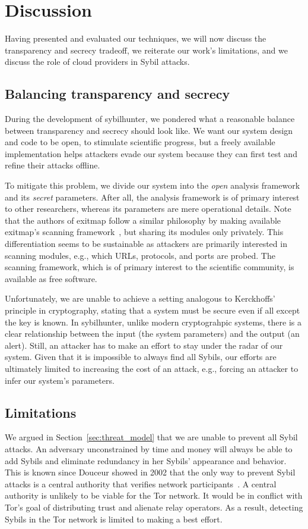 \section{Discussion}
\label{sec:discussion}
Having presented and evaluated our techniques, we will now discuss the
transparency and secrecy tradeoff, we reiterate our work's limitations, and we
discuss the role of cloud providers in Sybil attacks.

\subsection{Balancing transparency and secrecy}
\label{sec:secrecy}
During the development of sybilhunter, we pondered what a reasonable balance
between transparency and secrecy should look like.  We want our system design
and code to be open, to stimulate scientific progress, but a freely available
implementation helps attackers evade our system because they can first test and
refine their attacks offline.

To mitigate this problem, we divide our system into the \emph{open} analysis
framework and its \emph{secret} parameters.  After all, the analysis framework
is of primary interest to other researchers, whereas its parameters are mere
operational details.  Note that the authors of exitmap follow a similar
philosophy by making available exitmap's scanning framework~\cite{exitmap}, but
sharing its modules only privately.  This differentiation seems to be
sustainable as attackers are primarily interested in scanning modules, e.g.,
which URLs, protocols, and ports are probed.  The scanning framework, which is
of primary interest to the scientific community, is available as free software.

Unfortunately, we are unable to achieve a setting analogous to Kerckhoffs'
principle in cryptography, stating that a system must be secure even if all
except the key is known.  In sybilhunter, unlike modern cryptograhpic systems,
there is a clear relationship between the input (the system parameters) and the
output (an alert).  Still, an attacker has to make an effort to stay under the
radar of our system.  Given that it is impossible to always find all Sybils, our
efforts are ultimately limited to increasing the cost of an attack, e.g.,
forcing an attacker to infer our system's parameters.

\subsection{Limitations}
\label{sec:limitations}
We argued in Section~\ref{sec:threat_model} that we are unable to prevent all
Sybil attacks.  An adversary unconstrained by time and money will always be able
to add Sybils and eliminate redundancy in her Sybils' appearance and behavior.
This is known since Douceur showed in 2002 that the only way to prevent Sybil
attacks is a central authority that verifies network
participants~\cite{Douceur2002a}.  A central authority is unlikely to be viable
for the Tor network.  It would be in conflict with Tor's goal of distributing
trust and alienate relay operators.  As a result, detecting Sybils in the Tor
network is limited to making a best effort.

